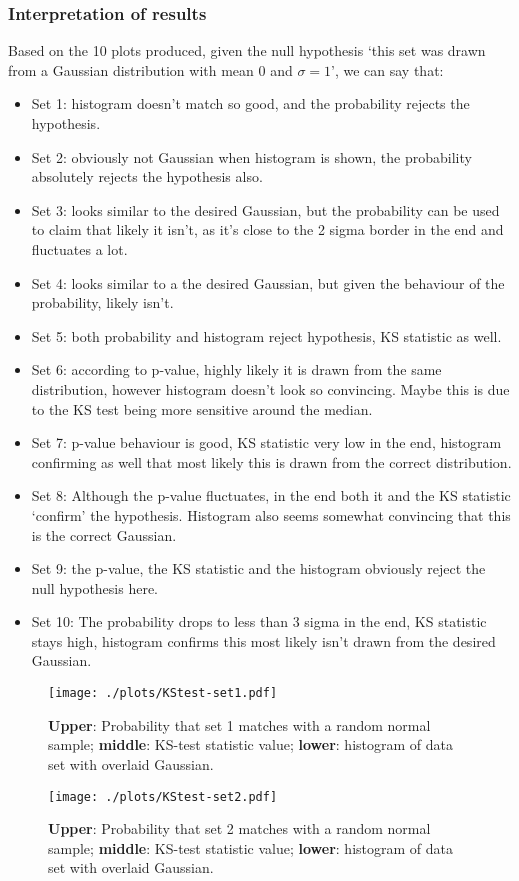 \documentclass{article}
\begin{document}
\subsubsection{Interpretation of results}
Based on the 10 plots produced, given the null hypothesis `this set was drawn from a Gaussian distribution with mean 0 and $\sigma = 1$', we can say that:
\begin{itemize}
    \item Set 1: histogram doesn't match so good, and the probability rejects the hypothesis.
    \item Set 2: obviously not Gaussian when histogram is shown, the probability absolutely rejects the hypothesis also.
    \item Set 3: looks similar to the desired Gaussian, but the probability can be used to claim that likely it isn't, as it's close to the 2 sigma border in the end and fluctuates a lot.
    \item Set 4: looks similar to a the desired Gaussian, but given the behaviour of the probability, likely isn't.
    \item Set 5: both probability and histogram reject hypothesis, KS statistic as well.
    \item Set 6: according to p-value, highly likely it is drawn from the same distribution, however histogram doesn't look so convincing. Maybe this is due to the KS test being more sensitive around the median.
    \item Set 7: p-value behaviour is good, KS statistic very low in the end, histogram confirming as well that most likely this is drawn from the correct distribution.
    \item Set 8: Although the p-value fluctuates, in the end both it and the KS statistic `confirm' the hypothesis. Histogram also seems somewhat convincing that this is the correct Gaussian.
    \item Set 9: the p-value, the KS statistic and the histogram obviously reject the null hypothesis here.
    \item Set 10: The probability drops to less than 3 sigma in the end, KS statistic stays high, histogram confirms this most likely isn't drawn from the desired Gaussian.
\end{itemize}

\begin{figure}[!h]
\centering
\begin{minipage}[t]{7.6cm}
    \centering
    \texttt{[image: ./plots/KStest-set1.pdf]}
    \caption{\textbf{Upper}: Probability that set 1 matches with a random normal sample; \textbf{middle}: KS-test statistic value; \textbf{lower}: histogram of data set with overlaid Gaussian.}
    \label{fig:KS-1}
\end{minipage}%
\qquad
\begin{minipage}[t]{7.6cm}
    \centering
    \texttt{[image: ./plots/KStest-set2.pdf]}
    \caption{\textbf{Upper}: Probability that set 2 matches with a random normal sample; \textbf{middle}: KS-test statistic value; \textbf{lower}: histogram of data set with overlaid Gaussian.}
    \label{fig:KS-2}
\end{minipage}%
\end{figure}
\end{document}
